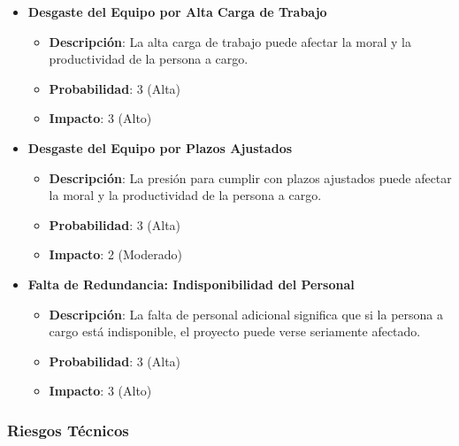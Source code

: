 \begin{itemize}
    \item \textbf{Desgaste del Equipo por Alta Carga de Trabajo}
          \begin{itemize}
              \item \textbf{Descripción}: La alta carga de trabajo puede afectar la moral y la productividad de la persona a cargo.
              \item \textbf{Probabilidad}: 3 (Alta)
              \item \textbf{Impacto}: 3 (Alto)
          \end{itemize}

    \item \textbf{Desgaste del Equipo por Plazos Ajustados}
          \begin{itemize}
              \item \textbf{Descripción}: La presión para cumplir con plazos ajustados puede afectar la moral y la productividad de la persona a cargo.
              \item \textbf{Probabilidad}: 3 (Alta)
              \item \textbf{Impacto}: 2 (Moderado)
          \end{itemize}

    \item \textbf{Falta de Redundancia: Indisponibilidad del Personal}
          \begin{itemize}
              \item \textbf{Descripción}: La falta de personal adicional significa que si la persona a cargo está indisponible, el proyecto puede verse seriamente afectado.
              \item \textbf{Probabilidad}: 3 (Alta)
              \item \textbf{Impacto}: 3 (Alto)
          \end{itemize}
\end{itemize}

\subsubsection{Riesgos Técnicos}

